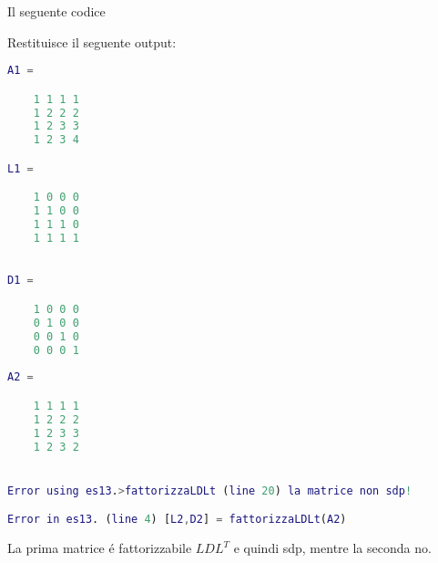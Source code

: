 Il seguente codice



Restituisce il seguente output:

\begin{lstlisting}[language=Matlab, basicstyle = \small]
A1 = 

	1 1 1 1 
	1 2 2 2 
	1 2 3 3 
	1 2 3 4 

L1 = 

	1 0 0 0 
	1 1 0 0 
	1 1 1 0 
	1 1 1 1
	

D1 = 

	1 0 0 0 
	0 1 0 0 
	0 0 1 0 
	0 0 0 1
	
A2 = 

	1 1 1 1 
	1 2 2 2 
	1 2 3 3 
	1 2 3 2 


Error using es13.>fattorizzaLDLt (line 20) la matrice non sdp! 

Error in es13. (line 4) [L2,D2] = fattorizzaLDLt(A2)

\end{lstlisting}


La prima matrice \'e fattorizzabile $LDL^T$ e quindi sdp, mentre la seconda no.

